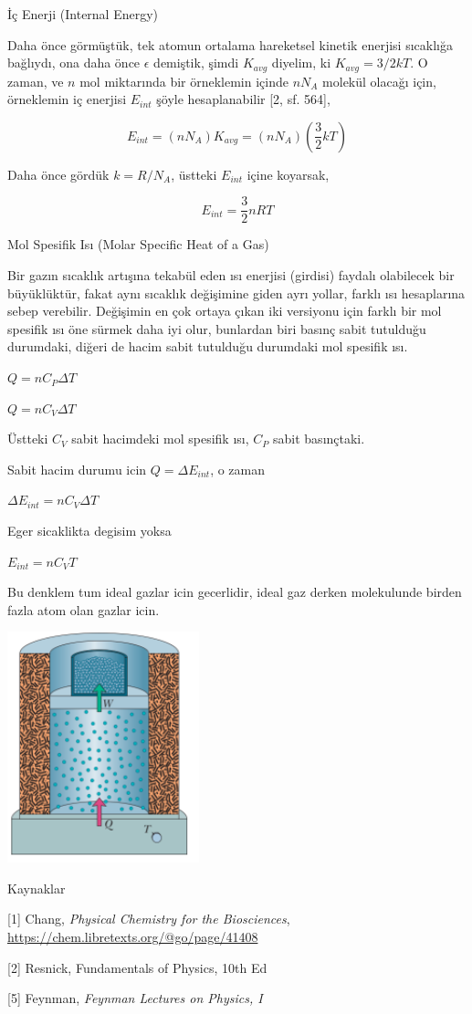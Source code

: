 \documentclass[12pt,fleqn]{article}\usepackage{../../common}
\begin{document}
İç Enerji (Internal Energy)

Daha önce görmüştük, tek atomun ortalama hareketsel kinetik enerjisi
sıcaklığa bağlıydı, ona daha önce $\epsilon$ demiştik, şimdi $K_{avg}$
diyelim, ki $K_{avg} = 3/2 k T$. O zaman, ve $n$ mol miktarında bir
örneklemin içinde $n N_A$ molekül olacağı için, örneklemin iç
enerjisi $E_{int}$ şöyle hesaplanabilir [2, sf. 564],

$$
E_{int} = (n N_A) K_{avg} = (n N_A) (\frac{3}{2} k T)
$$

Daha önce gördük $k = R/N_A$, üstteki $E_{int}$ içine koyarsak,

$$
E_{int} = \frac{3}{2} n R T
$$

Mol Spesifik Isı (Molar Specific Heat of a Gas)

Bir gazın sıcaklık artışına tekabül eden ısı enerjisi (girdisi) faydalı
olabilecek bir büyüklüktür, fakat aynı sıcaklık değişimine giden ayrı yollar,
farklı ısı hesaplarına sebep verebilir. Değişimin en çok ortaya çıkan iki
versiyonu için farklı bir mol spesifik ısı öne sürmek daha iyi olur, bunlardan
biri basınç sabit tutulduğu durumdaki, diğeri de hacim sabit tutulduğu
durumdaki mol spesifik ısı.

$Q = n C_P \Delta T$

$Q = n C_V \Delta T$

Üstteki $C_V$ sabit hacimdeki mol spesifik ısı, $C_P$ sabit basınçtaki.

Sabit hacim durumu icin $Q = \Delta E_{int}$, o zaman 

$\Delta E_{int} = n C_V \Delta T$

Eger sicaklikta degisim yoksa 

$E_{int} = n C_V T$

Bu denklem tum ideal gazlar icin gecerlidir, ideal gaz derken molekulunde birden
fazla atom olan gazlar icin.

\includegraphics[width=15em]{phy_005_basics_06.png}

Kaynaklar

[1] Chang, {\em Physical Chemistry for the Biosciences},
    \url{https://chem.libretexts.org/@go/page/41408}

[2] Resnick, Fundamentals of Physics, 10th Ed

[5] Feynman, {\em Feynman Lectures on Physics, I}
\end{document}
